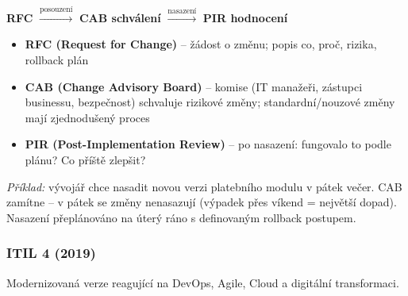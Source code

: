 \begin{center}\small
\textbf{RFC} $\xrightarrow{\text{posouzení}}$ \textbf{CAB schválení} $\xrightarrow{\text{nasazení}}$ \textbf{PIR hodnocení}
\end{center}

\begin{itemize}
  \item \textbf{RFC (Request for Change)} -- žádost o změnu; popis co, proč, rizika, rollback plán
  \item \textbf{CAB (Change Advisory Board)} -- komise (IT manažeři, zástupci businessu, bezpečnost) schvaluje rizikové změny; standardní/nouzové změny mají zjednodušený proces
  \item \textbf{PIR (Post-Implementation Review)} -- po nasazení: fungovalo to podle plánu? Co příště zlepšit?
\end{itemize}

\textit{Příklad:} vývojář chce nasadit novou verzi platebního modulu v pátek večer.
CAB zamítne -- v pátek se změny nenasazují (výpadek přes víkend = největší dopad). Nasazení přeplánováno na úterý ráno s definovaným rollback postupem.

\subsubsection{ITIL 4 (2019)}

Modernizovaná verze reagující na DevOps, Agile, Cloud a digitální transformaci.


